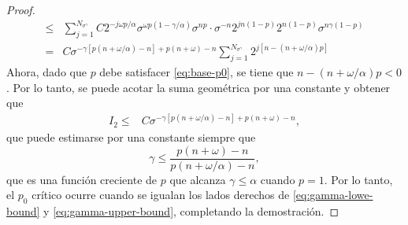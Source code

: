 \begin{proof}
\begin{align*}
		\leq & \sum_{j=1}^{N_{\sigma^\gamma}} C2^{-j\omega p/\alpha}\sigma^{\omega p(1-\gamma/\alpha)}\sigma^{np} \cdot \sigma^{-n}2^{jn(1-p)}2^{n(1-p)}\sigma^{n\gamma(1-p)}\\
		= & C\sigma^{-\gamma[p(n+\omega/\alpha)-n] +p(n+\omega)-n} \sum_{j=1}^{N_{\sigma^\gamma}} 2^{j[n-(n+\omega/\alpha)p]}
	\end{align*}
	Ahora, dado que $p$ debe satisfacer \cref{eq:base-p0}, se tiene que $n - (n+\omega/\alpha)p < 0$. Por lo tanto, se puede acotar la suma geométrica por una constante y obtener que
	\begin{align*}
		I_2 \leq & C\sigma^{-\gamma[p(n+\omega/\alpha)-n] +p(n+\omega)-n},
	\end{align*}
	que puede estimarse por una constante siempre que 
	\begin{equation}
		\gamma \leq \frac{p(n+\omega)-n}{p(n+\omega/\alpha)-n},
		\label{eq:gamma-upper-bound}
	\end{equation}
	que es una función creciente de $p$ que alcanza $\gamma \leq \alpha$ cuando $p=1$. Por lo tanto, el $p_0$ crítico ocurre cuando se igualan los lados derechos de \cref{eq:gamma-lowe-bound} y \cref{eq:gamma-upper-bound}, completando la demostración.
\end{proof} 

